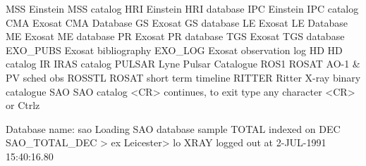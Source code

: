 \documentclass[nolof,11pt]{starlink}
\begin{document}
\begin{small}
\begin{terminalv}
    MSS         Einstein MSS catalog
    HRI         Einstein HRI database
    IPC         Einstein IPC catalog
    CMA         Exosat CMA Database
    GS          Exosat GS database
    LE          Exosat LE Database
    ME          Exosat ME database
    PR          Exosat PR database
    TGS         Exosat TGS database
    EXO_PUBS    Exosat bibliography
    EXO_LOG     Exosat observation log
    HD          HD catalog
    IR          IRAS catalog
    PULSAR      Lyne Pulsar Catalogue
    ROS1        ROSAT AO-1 & PV sched obs
    ROSSTL      ROSAT short term timeline
    RITTER      Ritter X-ray binary catalogue
    SAO         SAO catalog
 <CR> continues, to exit type any character <CR> or Ctrlz

Database name: sao
Loading SAO database sample TOTAL indexed on DEC
SAO_TOTAL_DEC > ex
Leicester> lo
  XRAY         logged out at  2-JUL-1991 15:40:16.80
\end{terminalv}
\end{small}
\end{document}
